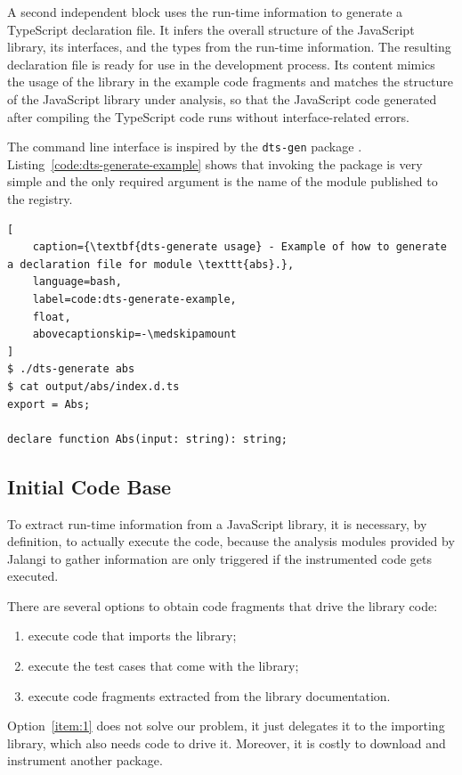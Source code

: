 \documentclass[a4paper,english,cleveref, autoref]{lipics-v2019}
\newcommand{\coderef}[1]{Listing~\ref{#1}}
\begin{document}
A second independent block uses the run-time information to generate a
TypeScript declaration file. It infers the overall structure of the JavaScript
library, its interfaces, and the types from the run-time information. 
The resulting declaration file is ready for use in the development
process. Its content mimics the usage of the library in the example
code fragments and matches the structure of the
JavaScript library under analysis, so that the JavaScript code
generated after compiling the TypeScript code runs without
interface-related errors.

The command line interface is inspired by the \texttt{dts-gen} package
\cite{dts-gen}. \coderef{code:dts-generate-example} shows
that invoking the package is very simple and the only required
argument is the name of the module published to the \NPM{} registry. 

\begin{lstlisting}[
    caption={\textbf{dts-generate usage} - Example of how to generate a declaration file for module \texttt{abs}.},
    language=bash,
	label=code:dts-generate-example,
    float,
    abovecaptionskip=-\medskipamount
]
$ ./dts-generate abs
$ cat output/abs/index.d.ts 
export = Abs;

declare function Abs(input: string): string;
\end{lstlisting}

\subsection{Initial Code Base}
\label{sec:initial-code-base}

To extract run-time information from a JavaScript library, it is
necessary, by definition, to actually execute the code, because the
analysis modules provided by Jalangi to gather information are only
triggered if the instrumented code gets executed.

There are several options to obtain code fragments that drive the
library code:
\begin{enumerate}
\item\label{item:1} execute code that imports the library;
\item\label{item:2} execute the test cases that come with the library;
\item\label{item:3} execute code fragments extracted from the library documentation.
\end{enumerate}

Option~\ref{item:1} does not solve our problem, it just delegates it
to the importing library, which also needs code to drive it. Moreover,
it is costly to download and instrument another package.
\end{document}
